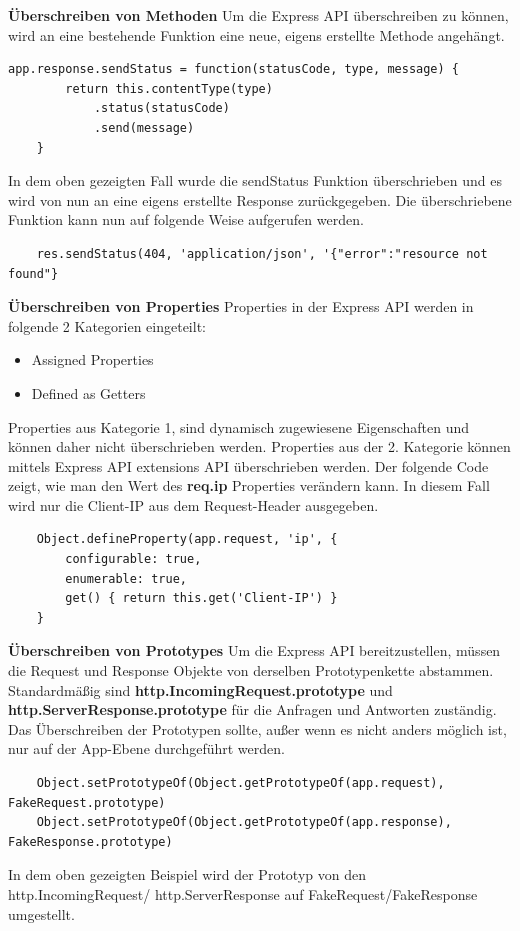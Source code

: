 \textbf{Überschreiben von Methoden}
\newline
Um die Express API überschreiben zu können, wird an eine bestehende Funktion eine neue, eigens erstellte Methode angehängt.
\begin{lstlisting}[caption=Überschreiben von Methoden]
    app.response.sendStatus = function(statusCode, type, message) {
        return this.contentType(type)
            .status(statusCode)
            .send(message)
    }
\end{lstlisting}
In dem oben gezeigten Fall wurde die sendStatus Funktion überschrieben und es wird von nun an eine eigens erstellte Response zurückgegeben. Die überschriebene Funktion kann nun auf folgende Weise aufgerufen werden.
\begin{lstlisting}
    res.sendStatus(404, 'application/json', '{"error":"resource not found"}            
\end{lstlisting}

\textbf{Überschreiben von Properties}
\newline
Properties in der Express API werden in folgende 2 Kategorien eingeteilt: 
\begin{itemize}
    \item Assigned Properties
    \item Defined as Getters
\end{itemize}
Properties aus Kategorie 1, sind dynamisch zugewiesene Eigenschaften und können daher nicht überschrieben werden. Properties aus der 2. Kategorie können mittels Express API extensions API überschrieben werden. Der folgende Code zeigt, wie man den Wert des \textbf{req.ip} Properties verändern kann. In diesem Fall wird nur die Client-IP aus dem Request-Header ausgegeben.
\begin{lstlisting}
    Object.defineProperty(app.request, 'ip', {
        configurable: true,
        enumerable: true,
        get() { return this.get('Client-IP') }
    }
\end{lstlisting}

\textbf{Überschreiben von Prototypes}
\newline
Um die Express API bereitzustellen, müssen die Request und Response Objekte von derselben Prototypenkette abstammen. Standardmäßig sind \textbf{http.IncomingRequest.prototype} und \textbf{http.ServerResponse.prototype} für die Anfragen und Antworten zuständig. Das Überschreiben der Prototypen sollte, außer wenn es nicht anders möglich ist, nur auf der App-Ebene durchgeführt werden.
\begin{lstlisting}
    Object.setPrototypeOf(Object.getPrototypeOf(app.request), FakeRequest.prototype)
    Object.setPrototypeOf(Object.getPrototypeOf(app.response), FakeResponse.prototype)
\end{lstlisting}
In dem oben gezeigten Beispiel wird der Prototyp von den http.IncomingRequest/ http.ServerResponse auf FakeRequest/FakeResponse umgestellt.
\cite{Express_js_overriding_api}

